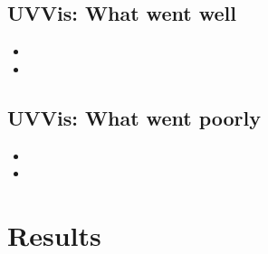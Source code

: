 \subsection{UVVis: What went well}

\begin{itemize}
\item{}
\item{}
\end{itemize}

\subsection{UVVis: What went poorly}

\begin{itemize}
\item{}
\item{}
\end{itemize}


\section{Results}


